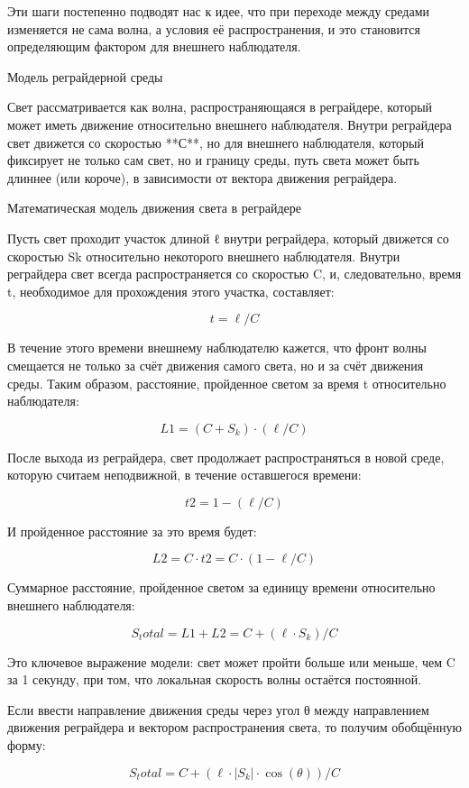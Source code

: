\documentclass[12pt]{article}
\begin{document}
Эти шаги постепенно подводят нас к идее, что при переходе между средами изменяется не сама волна, а условия её распространения, и это становится определяющим фактором для внешнего наблюдателя.


Модель реграйдерной среды

Свет рассматривается как волна, распространяющаяся в реграйдере, который может иметь движение относительно внешнего наблюдателя. Внутри реграйдера свет движется со скоростью **С**, но для внешнего наблюдателя, который фиксирует не только сам свет, но и границу среды, путь света может быть длиннее (или короче), в зависимости от вектора движения реграйдера.



Математическая модель движения света в реграйдере

Пусть свет проходит участок длиной ℓ внутри реграйдера, который движется со скоростью Sk относительно некоторого внешнего наблюдателя. Внутри реграйдера свет всегда распространяется со скоростью C, и, следовательно, время t, необходимое для прохождения этого участка, составляет:

\[
t = \ell / C
\]

В течение этого времени внешнему наблюдателю кажется, что фронт волны смещается не только за счёт движения самого света, но и за счёт движения среды. Таким образом, расстояние, пройденное светом за время t относительно наблюдателя:

\[
L1 = (C + S_k) \cdot (\ell / C)
\]

После выхода из реграйдера, свет продолжает распространяться в новой среде, которую считаем неподвижной, в течение оставшегося времени:

\[
t2 = 1 - (\ell / C)
\]

И пройденное расстояние за это время будет:

\[
L2 = C \cdot t2 = C \cdot (1 - \ell / C)
\]

Суммарное расстояние, пройденное светом за единицу времени относительно внешнего наблюдателя:

\[
S_total = L1 + L2 = C + (\ell \cdot S_k) / C
\]

Это ключевое выражение модели: свет может пройти больше или меньше, чем C за 1 секунду, при том, что локальная скорость волны остаётся постоянной.

Если ввести направление движения среды через угол θ между направлением движения реграйдера и вектором распространения света, то получим обобщённую форму:

\[
S_total = C + (\ell \cdot \left|S_k\right| \cdot \cos(\theta)) / C
\]
\end{document}
